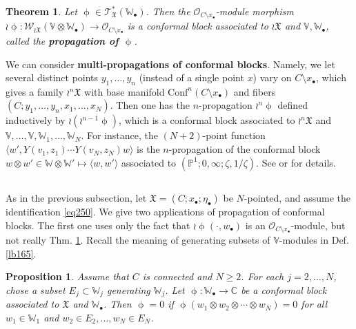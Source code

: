 \documentclass[11pt,b5paper,notitlepage]{article}
\theoremstyle{definition}
\theoremstyle{plain}
\newtheorem{thm}[df]{Theorem}
\newtheorem{pp}[df]{Proposition}
\newcommand{\fk}{\mathfrak}
\newcommand{\Conf}{\mathrm{Conf}}
\newcommand{\bk}[1]{\langle {#1}\rangle}
\newcommand{\scr}{\mathscr}
\newcommand{\blt}{\bullet}
\newcommand{\Vbb}{\mathbb V}
\newcommand{\Wbb}{\mathbb W}
\newcommand{\Cbb}{\mathbb C}
\newcommand{\Pbb}{\mathbb P}
\numberwithin{equation}{section}
\begin{document}
\begin{thm}\label{lb161}
Let $\upphi\in\scr T_{\fk X}^*(\Wbb_\blt)$. Then the $\scr O_{C\setminus x_\blt}$-module morphism $\wr\upphi:\scr W_{\wr\fk X}(\Vbb\otimes\Wbb_\blt)\rightarrow\scr O_{C\setminus x_\blt}$ is a conformal block associated to $\wr\fk X$ and $\Vbb,\Wbb_\blt$, called the \textbf{propagation of $\upphi$}. 
\end{thm}



We can consider \textbf{multi-propagations of conformal blocks}. Namely, we let several distinct points $y_1,\dots,y_n$ (instead of a single point $x$) vary on $C\setminus x_\blt$, which gives a family $\wr^n\fk X$ with base manifold $\Conf^n(C\setminus x_\blt)$ and fibers $(C;y_1,\dots,y_n,x_1,\dots,x_N)$. Then one has the  $n$-propagation $\wr^n\upphi$ defined inductively by $\wr(\wr^{n-1}\upphi)$, which is a conformal block associated to $\wr^n\fk X$ and $\Vbb,\dots,\Vbb,\Wbb_1,\dots,\Wbb_N$. For instance, the $(N+2)$-point function $\bk{w',Y(v_1,z_1)\cdots Y(v_N,z_N)w}$ is the $n$-propagation of the conformal block $w\otimes w'\in\Wbb\otimes\Wbb'\mapsto \bk{w,w'}$ associated to $(\Pbb^1;0,\infty;\zeta,1/\zeta)$. See \cite[Sec. 3.4]{Gui} or \cite{Gui21} for details.



\subsection{}




As in the previous subsection, let $\fk X=(C;x_\blt;\eta_\blt)$ be $N$-pointed, and assume the identification \eqref{eq250}. We give two applications of propagation of conformal blocks. The first one uses only the fact that $\wr\upphi(\cdot,w_\blt)$ is an $\scr O_{C\setminus x_\blt}$-module, but not really Thm. \ref{lb161}. Recall the meaning of generating subsets of $\Vbb$-modules in Def. \ref{lb165}.


\begin{pp}\label{lb167}
Assume that $C$ is connected and $N\geq 2$. For each $j=2,\dots,N$, chose a subset $E_j\subset \Wbb_j$ generating $\Wbb_j$. Let $\upphi:\Wbb_\blt\rightarrow\Cbb$ be a conformal block associated to $\fk X$ and $\Wbb_\blt$. Then $\upphi=0$ if $\upphi(w_1\otimes w_2\otimes\cdots\otimes w_N)=0$ for all $w_1\in\Wbb_1$ and $w_2\in E_2,\dots,w_N\in E_N$.
\end{pp}
\end{document}
